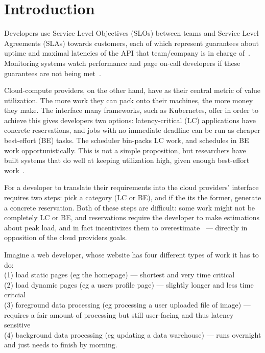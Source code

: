 \section{Introduction}

Developers use Service Level Objectives (SLOs) between teams and Service Level
Agreements (SLAs) towards customers, each of which represent guarantees about
uptime and maximal latencies of the API that team/company is in charge
of~\cite{awssla}. Monitoring systems watch performance and page on-call
developers if these guarantees are not being met~\cite{cloudwatch}.

Cloud-compute providers, on the other hand, have as their central metric of
value utilization. The more work they can pack onto their machines, the more
money they make. The interface many frameworks, such as Kubernetes, offer in
order to achieve this gives developers two options: latency-critical (LC)
applications have concrete reservations, and jobs with no immediate deadline can
be run as cheaper best-effort (BE) tasks. The scheduler bin-packs LC work, and
schedules in BE work opportunistically. This is not a simple proposition, but
researchers have built systems that do well at keeping utilization high, given
enough best-effort work~\cite{caladan}.


For a developer to translate their requirements into the cloud providers'
interface requires two steps: pick a category (LC or BE), and if the its the
former, generate a concrete reservation. Both of these steps are difficult: some
work might not be completely LC or BE, and reservations require the developer to
make estimations about peak load, and in fact incentivizes them to
overestimate~\cite*{overprovision} --- directly in opposition of the cloud
providers goals.

Imagine a web developer, whose website has four different types of work it has
to do: \\
(1) load static pages (eg the homepage) --- shortest and very time critical \\
(2) load dynamic pages (eg a users profile page) --- slightly longer and less
time critcial \\
(3) foreground data processing (eg processing a user uploaded file of image) ---
requires a fair amount of processing but still user-facing and thus latency
sensitive \\
(4) background data processing (eg updating a data warehouse) --- runs overnight
and just needs to finish by morning.

